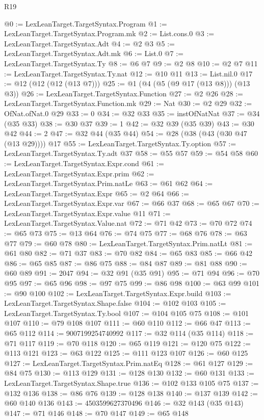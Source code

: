 \begin{lexlean}{R19}
\begin{coremodule}
@0 := LexLeanTarget.TargetSyntax.Program
@1 := LexLeanTarget.TargetSyntax.Program.mk
@2 := List.cons.{0}
@3 := LexLeanTarget.TargetSyntax.Adt
@4 := @2 @3
@5 := LexLeanTarget.TargetSyntax.Adt.mk
@6 := List.{0}
@7 := LexLeanTarget.TargetSyntax.Ty
@8 := @6 @7
@9 := @2 @8
@10 := @2 @7
@11 := LexLeanTarget.TargetSyntax.Ty.nat
@12 := @10 @11
@13 := List.nil.{0}
@17 := @12 (@12 (@12 (@13 @7)))
@25 := @1 (@4 (@5 (@9 @17 (@13 @8))) (@13 @3))
@26 := LexLeanTarget.TargetSyntax.Function
@27 := @2 @26
@28 := LexLeanTarget.TargetSyntax.Function.mk
@29 := Nat
@30 := @2 @29
@32 := OfNat.ofNat.{0} @29
@33 := 0
@34 := @32 @33
@35 := instOfNatNat
@37 := @34 (@35 @33)
@38 := @30 @37
@39 := 1
@42 := @32 @39 (@35 @39)
@43 := @30 @42
@44 := 2
@47 := @32 @44 (@35 @44)
@54 := @28 (@38 (@43 (@30 @47 (@13 @29)))) @17
@55 := LexLeanTarget.TargetSyntax.Ty.option
@57 := LexLeanTarget.TargetSyntax.Ty.adt @37
@58 := @55 @57
@59 := @54 @58
@60 := LexLeanTarget.TargetSyntax.Expr.cond
@61 := LexLeanTarget.TargetSyntax.Expr.prim
@62 := LexLeanTarget.TargetSyntax.Prim.natLe
@63 := @61 @62
@64 := LexLeanTarget.TargetSyntax.Expr
@65 := @2 @64
@66 := LexLeanTarget.TargetSyntax.Expr.var
@67 := @66 @37
@68 := @65 @67
@70 := LexLeanTarget.TargetSyntax.Expr.value @11
@71 := LexLeanTarget.TargetSyntax.Value.nat
@72 := @71 @42
@73 := @70 @72
@74 := @65 @73
@75 := @13 @64
@76 := @74 @75
@77 := @68 @76
@78 := @63 @77
@79 := @60 @78
@80 := LexLeanTarget.TargetSyntax.Prim.natLt
@81 := @61 @80
@82 := @71 @37
@83 := @70 @82
@84 := @65 @83
@85 := @66 @42
@86 := @65 @85
@87 := @86 @75
@88 := @84 @87
@89 := @81 @88
@90 := @60 @89
@91 := 2047
@94 := @32 @91 (@35 @91)
@95 := @71 @94
@96 := @70 @95
@97 := @65 @96
@98 := @97 @75
@99 := @86 @98
@100 := @63 @99
@101 := @90 @100
@102 := LexLeanTarget.TargetSyntax.Expr.build
@103 := LexLeanTarget.TargetSyntax.Shape.false
@104 := @102 @103
@105 := LexLeanTarget.TargetSyntax.Ty.bool
@107 := @104 @105 @75
@108 := @101 @107
@110 := @79 @108 @107
@111 := @60 @110
@112 := @66 @47
@113 := @65 @112
@114 := 9007199254740992
@117 := @32 @114 (@35 @114)
@118 := @71 @117
@119 := @70 @118
@120 := @65 @119
@121 := @120 @75
@122 := @113 @121
@123 := @63 @122
@125 := @111 @123 @107
@126 := @60 @125
@127 := LexLeanTarget.TargetSyntax.Prim.natEq
@128 := @61 @127
@129 := @84 @75
@130 := @113 @129
@131 := @128 @130
@132 := @60 @131
@133 := LexLeanTarget.TargetSyntax.Shape.true
@136 := @102 @133 @105 @75
@137 := @132 @136
@138 := @86 @76
@139 := @128 @138
@140 := @137 @139
@142 := @60 @140 @136
@143 := 4503599627370496
@146 := @32 @143 (@35 @143)
@147 := @71 @146
@148 := @70 @147
@149 := @65 @148

\end{coremodule}
\end{lexlean}
